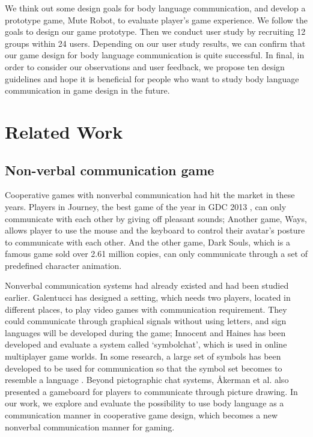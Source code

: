 \documentclass{sigchi}
\begin{document}
We think out some design goals for body language communication, and develop a prototype game, Mute Robot, to evaluate player's game experience. We follow the goals to design our game prototype. Then we conduct user study by recruiting 12 groups within 24 users. Depending on our user study results, we can confirm that our game design for body language communication is quite successful. In final, in order to consider our observations and user feedback, we propose ten design guidelines and hope it is beneficial for people who want to study body language communication in game design in the future. 


\section{Related Work}
\subsection{Non-verbal communication game}

Cooperative games with nonverbal communication had hit the market in these years. Players in Journey, the best game of the year in GDC 2013 \cite{I0}, can only communicate with each other by giving off pleasant sounds; Another game, Ways, allows player to use the mouse and the keyboard to control their avatar’s posture to communicate with each other. And the other game, Dark Souls, which is a famous game sold over 2.61 million copies, can only communicate through a set of predefined character animation.

Nonverbal communication systems had already existed and had been studied earlier. 
Galentucci \cite{I1} has designed a setting, which needs two players, located in different places, to play video games with communication requirement.
They could communicate through graphical signals without using letters, and sign languages will be developed during the game; 
Innocent and Haines \cite{I2} has been developed and evaluate a system called ‘symbolchat’, which is used in online multiplayer game worlds. In some research, a large set of symbols has been developed to be used for communication so that the symbol set becomes to resemble a language \cite{I3,I4}. Beyond pictographic chat systems, Åkerman et al. \cite{I5} also presented a gameboard for players to communicate through picture drawing. In our work, we explore and evaluate the possibility to use body language as a communication manner in cooperative game design, which becomes a new nonverbal communication manner for gaming.
\end{document}
